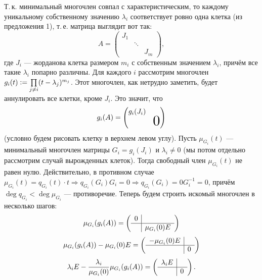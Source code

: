 \smallskip
{}
    Т.\,к. минимальный многочлен совпал с характеристическим, то каждому уникальному собственному значению $\lambda_i$ соответствует ровно одна клетка (из предложения 1), т.\,е. матрица выглядит вот так:
    \[
        A =
        \begin{pmatrix}
            J_1 & & \\
             & \ddots & \\
             & & J_m
        \end{pmatrix},
    \]
    где $J_i$ --- жорданова клетка размером $m_i$ с собственным значением $\lambda_i$, причём все такие $\lambda_i$ попарно различны. Для каждого $i$ рассмотрим многочлен $g_i(t) \vcentcolon = \prod\limits_{j \ne i}(t - \lambda_j)^{m_j}$. Этот многочлен, как нетрудно заметить, будет аннулировать все клетки, кроме $J_i$. Это значит, что
    \[
        g_i(A) =
        \begin{pmatrix}
            g_i(J_i) & \\
             & \scalebox{2}{$0$}
        \end{pmatrix}
    \]
    (условно будем рисовать клетку в верхнем левом углу). Пусть $\mu_{G_i}(t)$ --- минимальный многочлен матрицы $G_i = g_i(J_i)$ и $\lambda_i \ne 0$ (мы потом отдельно рассмотрим случай вырожденных клеток). Тогда свободный член $\mu_{G_i}(t)$ не равен нулю. Действительно, в противном случае $\mu_{G_i}(t) = q_{G_i}(t) \cdot t \Rightarrow q_{G_i}(G_i)G_i = 0 \Rightarrow q_{G_i}(G_i) = 0 G_i^{-1} = 0$, причём $\deg q_{G_i} < \deg \mu_{G_i}$ --- противоречие. Теперь будем строить искомый многочлен в несколько шагов:
    \[
        \mu_{G_i}(g_i(A)) =
        \left(
        \begin{array}{c | c}
            0 & \\
            \hline
             & \mu_{G_i}(0)E
        \end{array}
        \right)
    \]
    \[
        \mu_{G_i}(g_i(A)) - \mu_{G_i}(0)E =
        \left(
        \begin{array}{c | c}
            -\mu_{G_i}(0)E & \\
            \hline
             & 0
        \end{array}
        \right)
    \]
    \[
        \lambda_iE - \frac{\lambda_i}{\mu_{G_i}(0)}\mu_{G_i}(g_i(A)) =
        \left(
        \begin{array}{c | c}
            \lambda_iE & \\
            \hline
             & 0
        \end{array}
        \right).
    \]

